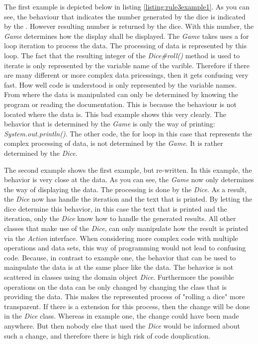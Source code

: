 The first example is depicted below in listing \ref{listing:rule3example1}. As you can see, the behaviour that indicates the number generated by the dice is indicated by the . However resulting number is returned by the dice. With this number, the \textit{Game} determines how the  display shall be displayed. The \textit{Game} takes uses a for loop iteration to process the data. The processing of data is represented by this loop. The fact that the resulting integer of the \textit{Dice#roll()} method is used to iterate is only represented by the variable name of the varible. Therefore if there are many different or more complex data pricessings, then it gets confusing very fast. How well code is understood is only represented by the variable names. From where the data is manipulated can only be determined by knowing the program or reading the documentation. This is because the behaviour is not located where the data is. This bad example shows this very clearly. The behavior that is determined by the \textit{Game} is only the way of printing: \textit{System.out.println()}. The other code, the for loop in this case that represents the complex processing of data, is not determined by the \textit{Game}. It is rather determined by the \textit{Dice}. 


\label{listing:rule3example1}

The second example shows the first example, but re-written. In this example, the behavior is very close at the data. As you can see, the \textit{Game} now only determines the way of displaying the data. The processing is done by the \textit{Dice}. As a result, the \textit{Dice} now has handle the iteration and the text that is printed. By letting the dice determine this behavior, in this case the text that is printed and the iteration, only the \textit{Dice} know how to handle the generated results. All other classes that make use of the \textit{Dice}, can only manipulate how the result is printed via the \textit{Action} interface. 
When considering more complex code with multiple operations and data sets, this way of programming would not lead to confusing code. Because, in contrast to example one, the behavior that can be used to mainpulate the data is at the same place like the data. The behavior is not scattered in classes using the domain object \textit{Dice}. Furthermore the possible operations on the data can be only changed by changing the class that is providing the data. This makes the represented process of "rolling a dice" more transparent. If there is a extension for this process, then the change will be done in the \textit{Dice} class. Whereas in example one, the change could have been made anywhere. But then nobody else that used the \textit{Dice} would be informed about such a change, and therefore there is high risk of code douplication. 



\label{listing:rule3example1}

